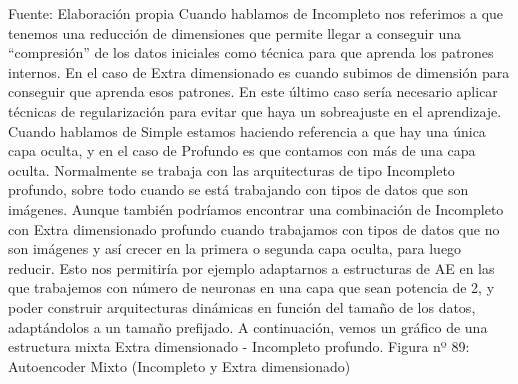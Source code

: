 \documentclass[
  a4paper,
  DIV=11,
  numbers=noendperiod]{scrreprt}
\begin{document}
Fuente: Elaboración propia Cuando hablamos de Incompleto nos referimos a
que tenemos una reducción de dimensiones que permite llegar a conseguir
una ``compresión'' de los datos iniciales como técnica para que aprenda
los patrones internos. En el caso de Extra dimensionado es cuando
subimos de dimensión para conseguir que aprenda esos patrones. En este
último caso sería necesario aplicar técnicas de regularización para
evitar que haya un sobreajuste en el aprendizaje. Cuando hablamos de
Simple estamos haciendo referencia a que hay una única capa oculta, y en
el caso de Profundo es que contamos con más de una capa oculta.
Normalmente se trabaja con las arquitecturas de tipo Incompleto
profundo, sobre todo cuando se está trabajando con tipos de datos que
son imágenes. Aunque también podríamos encontrar una combinación de
Incompleto con Extra dimensionado profundo cuando trabajamos con tipos
de datos que no son imágenes y así crecer en la primera o segunda capa
oculta, para luego reducir. Esto nos permitiría por ejemplo adaptarnos a
estructuras de AE en las que trabajemos con número de neuronas en una
capa que sean potencia de 2, y poder construir arquitecturas dinámicas
en función del tamaño de los datos, adaptándolos a un tamaño prefijado.
A continuación, vemos un gráfico de una estructura mixta Extra
dimensionado - Incompleto profundo. Figura nº 89: Autoencoder Mixto
(Incompleto y Extra dimensionado)
\end{document}

